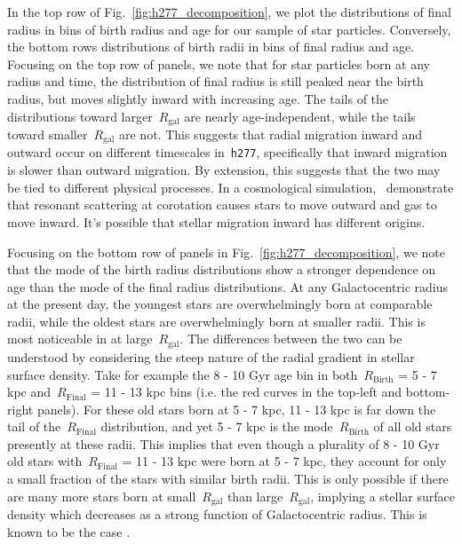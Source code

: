 \documentclass[fleqn, usenatbib]{mnras}
\begin{document}
In the top row of Fig.~\ref{fig:h277_decomposition}, we plot the distributions 
of final radius in bins of birth radius and age for our sample of star 
particles. Conversely, the bottom rows distributions of birth radii in bins of 
final radius and age. Focusing on the top row of panels, we note that for star 
particles born at any radius and time, the distribution of final radius is 
still peaked near the birth radius, but moves slightly inward with increasing 
age. The tails of the distributions toward larger~$R_\text{gal}$ are nearly 
age-independent, while the tails toward smaller~$R_\text{gal}$ are not. This 
suggests that radial migration inward and outward occur on different timescales 
in~\texttt{h277}, specifically that inward migration is slower than outward 
migration. By extension, this suggests that the two may be tied to different 
physical processes. In a cosmological simulation,~\citet{Roskar2008a} 
demonstrate that resonant scattering at corotation causes stars to move 
outward and gas to move inward. It's possible that stellar migration inward has 
different origins. 
\par 
Focusing on the bottom row of panels in Fig.~\ref{fig:h277_decomposition}, we 
note that the mode of the birth radius distributions show a stronger dependence 
on age than the mode of the final radius distributions. At any Galactocentric 
radius at the present day, the youngest stars are overwhelmingly born at 
comparable radii, while the oldest stars are overwhelmingly born at smaller 
radii. This is most noticeable in at large~$R_\text{gal}$. The differences 
between the two can be understood by considering the steep nature of the radial 
gradient in stellar surface density. Take for example the 8 - 10 Gyr age bin in 
both~$R_\text{Birth}$ = 5 - 7 kpc and~$R_\text{Final}$ = 11 - 13 kpc bins (i.e. 
the red curves in the top-left and bottom-right panels). For these old stars 
born at 5 - 7 kpc, 11 - 13 kpc is far down the tail of the~$R_\text{Final}$ 
distribution, and yet 5 - 7 kpc is the mode~$R_\text{Birth}$ of all old stars 
presently at these radii. This implies that even though a plurality of 8 - 10 
Gyr old stars with~$R_\text{Final}$ = 11 - 13 kpc were born at 5 - 7 kpc, they 
account for only a small fraction of the stars with similar birth radii. This 
is only possible if there are many more stars born at small~$R_\text{gal}$ than 
large~$R_\text{gal}$, implying a stellar surface density which decreases as a 
strong function of Galactocentric radius. This is known to be the case 
\citep[e.g.][]{Bland-Hawthorn2016}. 
\par 
\end{document}
